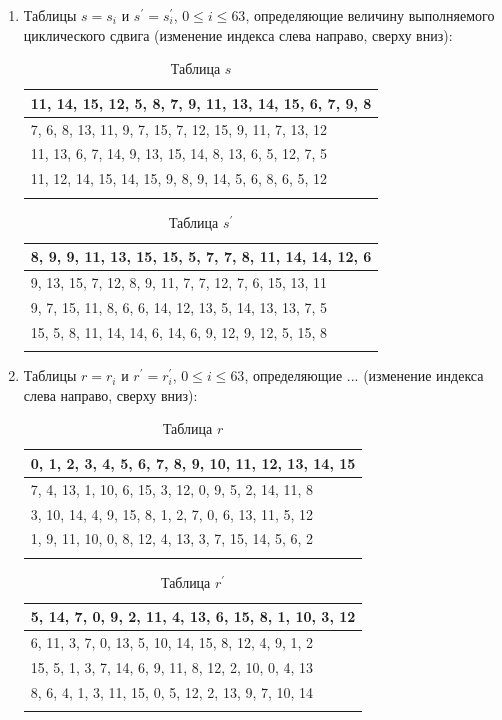 \documentclass{./civarticle}
\begin{document}
\begin{enumerate}
    \item Таблицы $s = s_i$ и $s^{'} = s^{'}_i$, $0 \leq i \leq 63$, определяющие величину выполняемого циклического сдвига (изменение индекса слева направо, сверху вниз):

    \begin{longtable}{|p{6cm}|}
\hline
11, 14, 15, 12, 5, 8, 7, 9, 11, 13, 14, 15, 6, 7, 9, 8 \\
\hline
7, 6, 8, 13, 11, 9, 7, 15, 7, 12, 15, 9, 11, 7, 13, 12 \\
\hline
11, 13, 6, 7, 14, 9, 13, 15, 14, 8, 13, 6, 5, 12, 7, 5 \\
\hline
11, 12, 14, 15, 14, 15, 9, 8, 9, 14, 5, 6, 8, 6, 5, 12 \\
\hline
\caption{Таблица $s$}
\end{longtable}

    \begin{longtable}{|p{6cm}|}
\hline
8, 9, 9, 11, 13, 15, 15, 5, 7, 7, 8, 11, 14, 14, 12, 6 \\
\hline
9, 13, 15, 7, 12, 8, 9, 11, 7, 7, 12, 7, 6, 15, 13, 11 \\
\hline
9, 7, 15, 11, 8, 6, 6, 14, 12, 13, 5, 14, 13, 13, 7, 5 \\
\hline
15, 5, 8, 11, 14, 14, 6, 14, 6, 9, 12, 9, 12, 5, 15, 8 \\
\hline
\caption{Таблица $s^{'}$}
\end{longtable}

    \item Таблицы $r = r_i$ и $r^{'} = r^{'}_i$, $0 \leq i \leq 63$, определяющие ... (изменение индекса слева направо, сверху вниз):

    \begin{longtable}{|p{6cm}|}
\hline
0, 1, 2, 3, 4, 5, 6, 7, 8, 9, 10, 11, 12, 13, 14, 15 \\
\hline
7, 4, 13, 1, 10, 6, 15, 3, 12, 0, 9, 5, 2, 14, 11, 8 \\
\hline
3, 10, 14, 4, 9, 15, 8, 1, 2, 7, 0, 6, 13, 11, 5, 12 \\
\hline
1, 9, 11, 10, 0, 8, 12, 4, 13, 3, 7, 15, 14, 5, 6, 2 \\
\hline
\caption{Таблица $r$}
\end{longtable}

    \begin{longtable}{|p{6cm}|}
\hline
5, 14, 7, 0, 9, 2, 11, 4, 13, 6, 15, 8, 1, 10, 3, 12 \\
\hline
6, 11, 3, 7, 0, 13, 5, 10, 14, 15, 8, 12, 4, 9, 1, 2 \\
\hline
15, 5, 1, 3, 7, 14, 6, 9, 11, 8, 12, 2, 10, 0, 4, 13 \\
\hline
8, 6, 4, 1, 3, 11, 15, 0, 5, 12, 2, 13, 9, 7, 10, 14 \\
\hline
\caption{Таблица $r^{'}$}
\end{longtable}
\end{enumerate}
\end{document}
